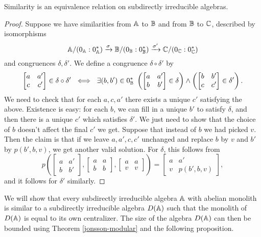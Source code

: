 \documentclass[letterpaper,11pt]{article}
\begin{document}
\begin{cor} Similarity is an equivalence relation on subdirectly irreducible algebras.
\end{cor}
\begin{proof} Suppose we have similarities from $\mathbb{A}$ to $\mathbb{B}$ and from $\mathbb{B}$ to $\mathbb{C}$, described by isomorphisms
\[
\mathbb{A}/(0_{\mathbb{A}}:0_{\mathbb{A}}^*) \xrightarrow{\sigma} \mathbb{B}/(0_{\mathbb{B}}:0_{\mathbb{B}}^*) \xrightarrow{\sigma'} \mathbb{C}/(0_{\mathbb{C}}:0_{\mathbb{C}}^*)
\]
and congruences $\delta, \delta'$. We define a congruence $\delta \circ \delta'$ by
\[
\begin{bmatrix} a & a'\\ c & c'\end{bmatrix} \in \delta \circ \delta'\ \iff\ \exists (b,b') \in 0_{\mathbb{B}}^*\ \left(\begin{bmatrix} a & a'\\ b & b'\end{bmatrix} \in \delta\right) \wedge \left(\begin{bmatrix} b & b'\\ c & c'\end{bmatrix} \in \delta'\right).
\]
We need to check that for each $a,c,a'$ there exists a unique $c'$ satisfying the above. Existence is easy: for each $b$, we can fill in a unique $b'$ to satisfy $\delta$, and then there is a unique $c'$ which satisfies $\delta'$. We just need to show that the choice of $b$ doesn't affect the final $c'$ we get. Suppose that instead of $b$ we had picked $v$. Then the claim is that if we leave $a,a',c,c'$ unchanged and replace $b$ by $v$ and $b'$ by $p(b',b,v)$, we get another valid solution. For $\delta$, this follows from
\[
p\left(\begin{bmatrix} a & a'\\ b & b'\end{bmatrix}, \begin{bmatrix} a & a\\ b & b\end{bmatrix}, \begin{bmatrix} a & a\\ v & v\end{bmatrix}\right) = \begin{bmatrix} a & a'\\ v & p(b',b,v)\end{bmatrix},
\]
and it follows for $\delta'$ similarly.
\end{proof}

We will show that every subdirectly irreducible algebra $\mathbb{A}$ with abelian monolith is similar to a subdirectly irreducible algebra $D(\mathbb{A})$ such that the monolith of $D(\mathbb{A})$ is equal to its own centralizer. The size of the algebra $D(\mathbb{A})$ can then be bounded using Theorem \ref{jonsson-modular} and the following proposition.
\end{document}
